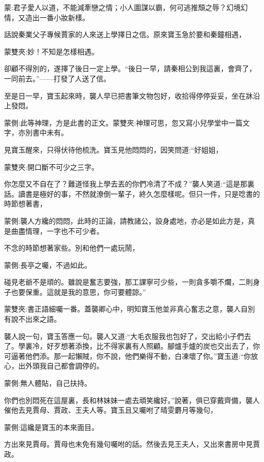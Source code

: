 
\begin{parag}
    \begin{note}蒙:君子愛人以道，不能減牽戀之情；小人圖謀以霸，何可逃推頹之辱？幻境幻情，又造出一番小妝新樣。\end{note}
\end{parag}


\begin{parag}
    話說秦業父子專候賈家的人來送上學擇日之信。原來寶玉急於要和秦鐘相遇，\begin{note}蒙雙夾:妙！不知是怎樣相遇。\end{note}卻顧不得別的，遂擇了後日一定上學。“後日一早，請秦相公到我這裏，會齊了，一同前去。”——打發了人送了信。
\end{parag}


\begin{parag}
    至是日一早，寶玉起來時，襲人早已把書筆文物包好，收拾得停停妥妥，坐在牀沿上發悶。\begin{note}蒙側:此等神理，方是此書的正文。蒙雙夾:神理可思，忽又寫小兒學堂中一篇文字，亦別書中未有。\end{note}見寶玉醒來，只得伏待他梳洗。寶玉見他悶悶的，因笑問道:“好姐姐，\begin{note}蒙雙夾:開口斷不可少之三字。\end{note}你怎麼又不自在了？難道怪我上學去丟的你們冷清了不成？”襲人笑道:“這是那裏話。讀書是極好的事，不然就潦倒一輩子，終久怎麼樣呢。但只一件，只是唸書的時節想著書，\begin{note}蒙側:襲人方纔的悶悶，此時的正論，請教諸公，設身處地，亦必是如此方是，真是曲盡情理，一字也不可少者。\end{note}不念的時節想著家些。別和他們一處玩鬧，\begin{note}蒙側:長亭之囑，不過如此。\end{note}碰見老爺不是頑的。雖說是奮志要強，那工課寧可少些，一則貪多嚼不爛，二則身子也要保重。這就是我的意思，你可要體諒。”\begin{note}蒙雙夾:書正語細囑一番。蓋襲卿心中，明知寶玉他並非真心奮志之意，襲人自別有說不出來之語。\end{note}襲人說一句，寶玉答應一句。襲人又道:“大毛衣服我也包好了，交出給小子們去了。學裏冷，好歹想著添換，比不得家裏有人照顧。腳爐手爐的炭也交出去了，你可逼著他們添。那一起懶賊，你不說，他們樂得不動，白凍壞了你。”寶玉道:“你放心，出外頭我自己都會調停的。\begin{note}蒙側:無人體貼，自己扶持。\end{note}你們也別悶死在這屋裏，長和林妹妹一處去頑笑纔好。”說著，俱已穿戴齊備，襲人催他去見賈母、賈政、王夫人等。寶玉且又囑咐了晴雯麝月等幾句，\begin{note}蒙側:這纔是寶玉的本來面目。\end{note}方出來見賈母。賈母也未免有幾句囑咐的話。然後去見王夫人，又出來書房中見賈政。
\end{parag}


